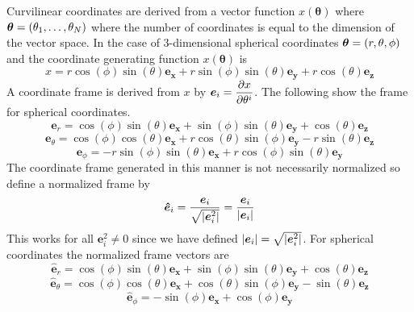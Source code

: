 \documentclass[letterpaper,10pt,english]{sphinxmanual}
\begin{document}
Curvilinear coordinates are derived from a vector function
$x(\bm{\theta})$ where
$\boldsymbol{\theta} = \left (\theta_{1},\dots,\theta_{N}\right )$ where the number of
coordinates is equal to the dimension of the vector space.  In the case of
3-dimensional spherical coordinates $\boldsymbol{\theta} = \left ( r,\theta,\phi \right )$
and the coordinate generating function $x(\bm{\theta})$ is
\begin{equation*}
x =  r \cos\left({\phi}\right) \sin\left({\theta}\right){\bm{{e}_{x}}}+ r \sin\left({\phi}\right) \sin\left({\theta}\right){\bm{{e}_{y}}}+ r \cos\left({\theta}\right){\bm{{e}_{z}}}
\end{equation*}
A coordinate frame is derived from $x$ by
$\boldsymbol{e}_{i} = \displaystyle\frac{\partial {x}}{\partial {\theta^{i}}}$.  The following show the frame for
spherical coordinates.
\begin{equation*}
\bm{e}_{r} = \cos\left({\phi}\right) \sin\left({\theta}\right){\bm{{e}_{x}}}+\sin\left({\phi}\right) \sin\left({\theta}\right){\bm{{e}_{y}}}+\cos\left({\theta}\right){\bm{{e}_{z}}}
\end{equation*}\begin{equation*}
\bm{e}_{{\theta}} = \cos\left({\phi}\right) \cos\left({\theta}\right){\bm{{e}_{x}}}+r \cos\left({\theta}\right) \sin\left({\phi}\right){\bm{{e}_{y}}} - r \sin\left({\theta}\right){\bm{{e}_{z}}}
\end{equation*}\begin{equation*}
\bm{e}_{{\phi}} =  - r \sin\left({\phi}\right) \sin\left({\theta}\right){\bm{{e}_{x}}}+r \cos\left({\phi}\right) \sin\left({\theta}\right){\bm{{e}_{y}}}
\end{equation*}
The coordinate frame generated in this manner is not necessarily normalized so
define a normalized frame by
\begin{equation*}
\boldsymbol{\hat{e}}_{i} = \displaystyle\frac{\boldsymbol{e}_{i}}{\sqrt{\left |{\boldsymbol{e}_{i}^{2}}\right |}} = \displaystyle\frac{\boldsymbol{e}_{i}}{\left |{\boldsymbol{e}_{i}}\right |}
\end{equation*}
This works for all $\bm{e}_{i}^{2} \neq 0$ since we have defined
$\left |{\boldsymbol{e}_{i}}\right | = \sqrt{\left |{\boldsymbol{e}_{i}^{2}}\right |}$.   For spherical
coordinates the normalized frame vectors are
\begin{equation*}
\bm{\hat{e}}_{r} =  \cos\left({\phi}\right) \sin\left({\theta}\right){\bm{{e}_{x}}}+\sin\left({\phi}\right) \sin\left({\theta}\right){\bm{{e}_{y}}}+\cos\left({\theta}\right){\bm{{e}_{z}}}
\end{equation*}\begin{equation*}
\bm{\hat{e}}_{{\theta}} = \cos\left({\phi}\right) \cos\left({\theta}\right){\bm{{e}_{x}}}+\cos\left({\theta}\right) \sin\left({\phi}\right){\bm{{e}_{y}}}- \sin\left({\theta}\right){\bm{{e}_{z}}}
\end{equation*}\begin{equation*}
\bm{\hat{e}}_{{\phi}} = - \sin\left({\phi}\right){\bm{{e}_{x}}}+\cos\left({\phi}\right){\bm{{e}_{y}}}
\end{equation*}
\end{document}
